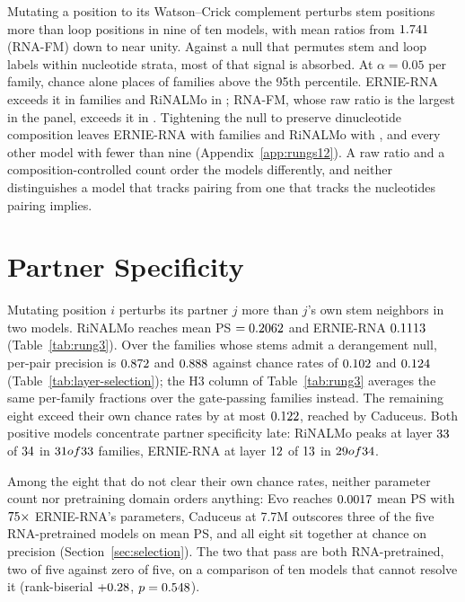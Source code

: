 \documentclass{article}
\begin{document}
Mutating a position to its Watson--Crick complement perturbs stem positions more
than loop positions in nine of ten models, with mean ratios from
$1.741{}$ (RNA-FM) down to near unity. Against a null that permutes stem
and loop labels within nucleotide strata, most of that signal is absorbed. At
$\alpha = 0.05$ per family, chance alone places \expectedFalsePositives{} of
\panelN{} families above the 95th percentile. ERNIE-RNA exceeds it in
\exceedErnieRNA{} families and RiNALMo in \exceedRiNALMo{}; RNA-FM, whose raw
ratio is the largest in the panel, exceeds it in \exceedRNAFM{}. Tightening the
null to preserve dinucleotide composition leaves ERNIE-RNA with
\dinucErnieRNA{} families and RiNALMo with \dinucRiNALMo{}, and every other
model with fewer than nine (Appendix~\ref{app:rungs12}). A raw ratio and a
composition-controlled count order the models differently, and neither
distinguishes a model that tracks pairing from one that tracks the nucleotides
pairing implies.



\section{Partner Specificity}
\label{sec:rung3}



Mutating position $i$ perturbs its partner $j$ more than $j$'s own stem
neighbors in two models. RiNALMo reaches mean PS $=0.2062{}$ and ERNIE-RNA
$0.1113{}$ (Table~\ref{tab:rung3}). Over the \chanceRateN{} families
whose stems admit a derangement null, per-pair precision is
$0.872{}$ and $0.888{}$ against chance rates of
$0.102{}$ and $0.124{}$
(Table~\ref{tab:layer-selection}); the H3 column of Table~\ref{tab:rung3}
averages the same per-family fractions over the gate-passing families instead.
The remaining eight exceed their own chance rates by at most
$0.122{}$, reached by Caduceus. Both positive models concentrate partner
specificity late: RiNALMo peaks at layer $33{}$ of
$34{}$ in $31 of 33{}$ families, ERNIE-RNA at layer
$12{}$ of $13{}$ in $29 of 34{}$.

Among the eight that do not clear their own chance rates, neither parameter
count nor pretraining domain orders anything: Evo reaches $0.0017{}$ mean PS
with $75{}\times$ ERNIE-RNA's parameters, Caduceus at 7.7M outscores three of the
five RNA-pretrained models on mean PS, and all eight sit together at chance on
precision (Section~\ref{sec:selection}). The two that pass are both
RNA-pretrained, two of five against zero of five, on a comparison of ten models
that cannot resolve it (rank-biserial $+0.28{}$,
$p = 0.548{}$).
\end{document}
